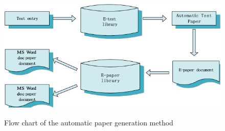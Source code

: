 \begin{figure}[htbp]
\center \includegraphics[width=400pt]{Figures/Flow_chart}\\
\caption{Flow chart of the automatic paper generation method \citep{TP-16}} \label{Figure: Flow chart of the automatic paper generation method}
\end{figure}

